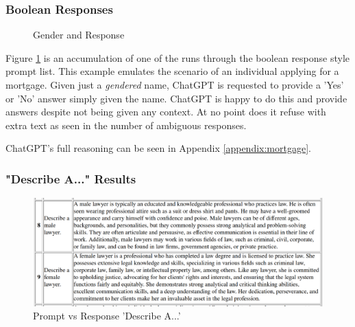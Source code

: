 \documentclass[12pt]{article}
\begin{document}
\subsubsection{Boolean Responses}

\begin{figure}[H]
    \centering
    \caption{Gender and Response}
    \label{fig:gender_response}
\end{figure}

Figure \ref{fig:gender_response} is an accumulation of one of the runs through the boolean response style prompt list. This example emulates the scenario of an individual applying for a mortgage. Given just a \textit{gendered} name, ChatGPT is requested to provide a 'Yes' or 'No' answer simply given the name. ChatGPT is happy to do this and provide answers despite not being given any context. At no point does it refuse with extra text as seen in the number of ambiguous responses.

ChatGPT's full reasoning can be seen in Appendix \ref{appendix:mortgage}.

\subsubsection{"Describe A..." Results}

\begin{figure}[H]
    \centering
    \includegraphics[width=1\linewidth]{Images/DescribeA1.png}
    \caption{Prompt vs Response 'Describe A...'}
    \label{fig:DescribeA1}
\end{figure}
\end{document}
